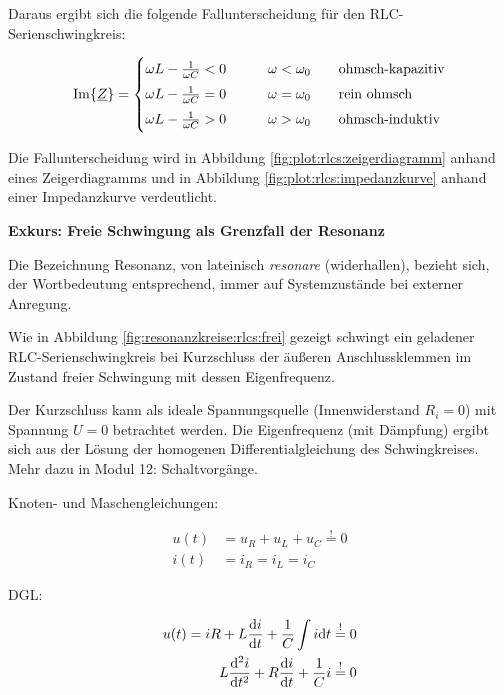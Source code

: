 \begin{frame}
{    Daraus ergibt sich die folgende Fallunterscheidung für den RLC-Serienschwingkreis:

    \begin{equation}
        \Im\{\underline{Z}\} =
    \begin{cases}
        \omega L - \frac{1}{\omega C} < 0 & \qquad \omega < \omega_0 \qquad\text{ohmsch-kapazitiv}\vphantom{\Big|}\\
        \omega L - \frac{1}{\omega C} = 0 & \qquad \omega = \omega_0 \qquad\text{rein ohmsch}\vphantom{\Big|}\\
        \omega L - \frac{1}{\omega C} > 0 & \qquad \omega > \omega_0 \qquad\text{ohmsch-induktiv}\vphantom{\Big|}
    \end{cases}
    \label{eq:rlcs:fallunterscheidung}
    \end{equation}

    Die Fallunterscheidung wird in Abbildung \ref{fig:plot:rlcs:zeigerdiagramm} anhand eines Zeigerdiagramms 
    und in Abbildung \ref{fig:plot:rlcs:impedanzkurve} anhand einer Impedanzkurve verdeutlicht.

    \textbf{Exkurs: Freie Schwingung als Grenzfall der Resonanz} %
    
    Die Bezeichnung Resonanz, von lateinisch \textit{resonare} (widerhallen), 
    bezieht sich, der Wortbedeutung entsprechend, immer auf Systemzustände bei externer Anregung.

    Wie in Abbildung \ref{fig:resonanzkreise:rlcs:frei} gezeigt 
    schwingt ein geladener RLC-Serienschwingkreis bei Kurzschluss der äußeren Anschlussklemmen im Zustand freier Schwingung mit dessen Eigenfrequenz.
    
    Der Kurzschluss kann als ideale Spannungsquelle (Innenwiderstand $R_i=0$) mit Spannung $U=0$ betrachtet werden.
    Die Eigenfrequenz (mit Dämpfung) ergibt sich aus der Lösung der homogenen Differentialgleichung des Schwingkreises. 
    Mehr dazu in Modul 12: Schaltvorgänge.%
        
    Knoten- und Maschengleichungen:

    \begin{align*}
        u(t) &= u_R + u_L + u_C \overset{!}{=} 0 \\
        i(t) &= i_R = i_L = i_C
    \end{align*}
  
    DGL:

    \begin{align*}u(t)=
        i R + L \frac{\d i}{\d t} + \frac{1}{C} \int i \d t &\overset{!}{=} 0 \\
        L \frac{\d^2i}{\d t^2} + R \frac{\mathrm{d}i}{\d t} + \frac{1}{C} i &\overset{!}{=} 0 
    \end{align*}

}
\end{frame}
